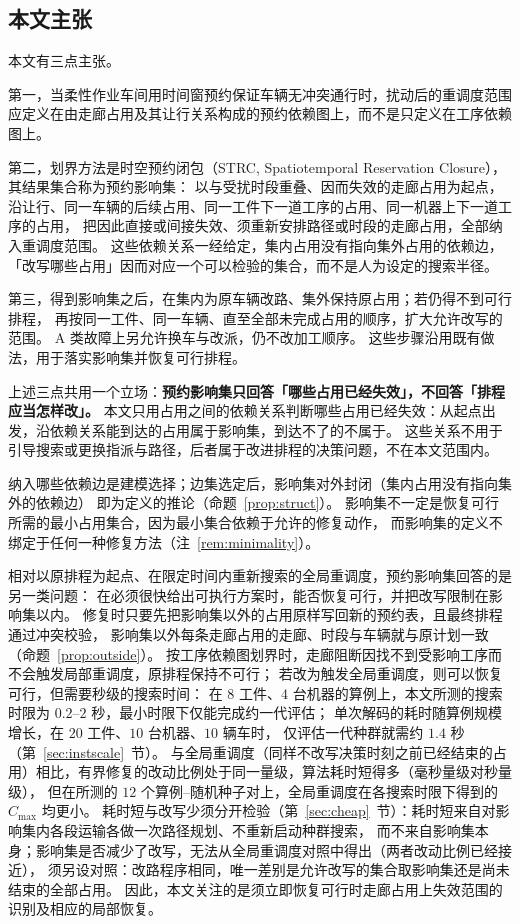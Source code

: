 \documentclass[manuscript,screen,review]{acmart}
\providecommand{\STRC}{\textsc{STRC}}
\newcommand{\EfiveCells}{12}        %
\begin{document}
\subsection{本文主张}

本文有三点主张。

第一，当柔性作业车间用时间窗预约保证车辆无冲突通行时，扰动后的重调度范围应定义在由走廊占用及其让行关系构成的预约依赖图上，而不是只定义在工序依赖图上。

第二，划界方法是时空预约闭包（\STRC, Spatiotemporal Reservation Closure），其结果集合称为预约影响集：
以与受扰时段重叠、因而失效的走廊占用为起点，沿让行、同一车辆的后续占用、同一工件下一道工序的占用、同一机器上下一道工序的占用，
把因此直接或间接失效、须重新安排路径或时段的走廊占用，全部纳入重调度范围。
这些依赖关系一经给定，集内占用没有指向集外占用的依赖边，
「改写哪些占用」因而对应一个可以检验的集合，而不是人为设定的搜索半径。

第三，得到影响集之后，在集内为原车辆改路、集外保持原占用；若仍得不到可行排程，
再按同一工件、同一车辆、直至全部未完成占用的顺序，扩大允许改写的范围。
A 类故障上另允许换车与改派，仍不改加工顺序。
这些步骤沿用既有做法，用于落实影响集并恢复可行排程。

上述三点共用一个立场：\textbf{预约影响集只回答「哪些占用已经失效」，不回答「排程应当怎样改」。}
本文只用占用之间的依赖关系判断哪些占用已经失效：从起点出发，沿依赖关系能到达的占用属于影响集，到达不了的不属于。
这些关系不用于引导搜索或更换指派与路径，后者属于改进排程的决策问题，不在本文范围内。

纳入哪些依赖边是建模选择；边集选定后，影响集对外封闭（集内占用没有指向集外的依赖边）
即为定义的推论（命题~\ref{prop:struct}）。
影响集不一定是恢复可行所需的最小占用集合，因为最小集合依赖于允许的修复动作，
而影响集的定义不绑定于任何一种修复方法（注~\ref{rem:minimality}）。

相对以原排程为起点、在限定时间内重新搜索的全局重调度，预约影响集回答的是另一类问题：
在必须很快给出可执行方案时，能否恢复可行，并把改写限制在影响集以内。
修复时只要先把影响集以外的占用原样写回新的预约表，且最终排程通过冲突校验，
影响集以外每条走廊占用的走廊、时段与车辆就与原计划一致（命题~\ref{prop:outside}）。
按工序依赖图划界时，走廊阻断因找不到受影响工序而不会触发局部重调度，原排程保持不可行；
若改为触发全局重调度，则可以恢复可行，但需要秒级的搜索时间：
在 \(8\) 工件、\(4\) 台机器的算例上，本文所测的搜索时限为 \(0.2\)--\(2\) 秒，最小时限下仅能完成约一代评估；
单次解码的耗时随算例规模增长，在 \(20\) 工件、\(10\) 台机器、\(10\) 辆车时，
仅评估一代种群就需约 \(1.4\) 秒（第~\ref{sec:instscale}~节）。
与全局重调度（同样不改写决策时刻之前已经结束的占用）相比，有界修复的改动比例处于同一量级，算法耗时短得多（毫秒量级对秒量级），
但在所测的 \(\EfiveCells\) 个算例--随机种子对上，全局重调度在各搜索时限下得到的 \(C_{\max}\) 均更小。
耗时短与改写少须分开检验（第~\ref{sec:cheap}~节）：耗时短来自对影响集内各段运输各做一次路径规划、不重新启动种群搜索，
而不来自影响集本身；影响集是否减少了改写，无法从全局重调度对照中得出（两者改动比例已经接近），
须另设对照：改路程序相同，唯一差别是允许改写的集合取影响集还是尚未结束的全部占用。
因此，本文关注的是须立即恢复可行时走廊占用上失效范围的识别及相应的局部恢复。
\end{document}
